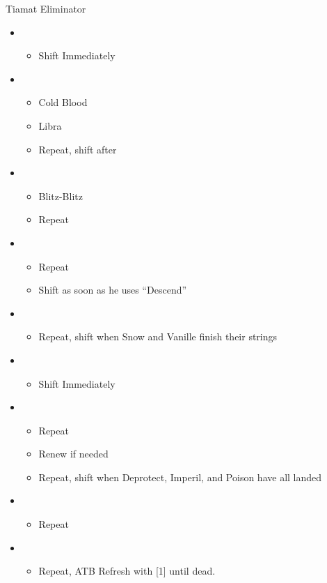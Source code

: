 	\begin{battle}[1:55]{Tiamat Eliminator}
		\begin{itemize}
			\item \second
			      \begin{itemize}
				      \item Shift Immediately
			      \end{itemize}
			\item \sixth
			      \begin{itemize}
				      \item Cold Blood
				      \item Libra
				      \item Repeat, shift after \stagger
			      \end{itemize}
			\item \second
			      \begin{itemize}
				      \item Blitz-Blitz
				      \item Repeat
			      \end{itemize}
			\item \first
			      \begin{itemize}
				      \item Repeat
				      \item Shift as soon as he uses ``Descend''
			      \end{itemize}
			\item \fifth
			      \begin{itemize}
				      \item Repeat, shift when Snow and Vanille finish their strings
			      \end{itemize}
			\item \sixth
			      \begin{itemize}
				      \item Shift Immediately
			      \end{itemize}
			\item \fifth
			      \begin{itemize}
				      \item Repeat
				      \item Renew if needed
				      \item Repeat, shift when Deprotect, Imperil, and Poison have all landed
			      \end{itemize}
			\item \sixth
			      \begin{itemize}
				      \item Repeat
			      \end{itemize}
			\item \second
			      \begin{itemize}
				      \item Repeat, ATB Refresh with [1] until dead.
			      \end{itemize}
		\end{itemize}
	\end{battle}

